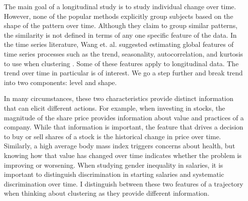 The main goal of a longitudinal study is to study individual change over time. However, none of the popular methods explicitly group subjects based on the shape of the pattern over time. Although they claim to group similar patterns, the similarity is not defined in terms of any one specific feature of the data. In the time series literature, Wang et. al. suggested estimating global features of time series processes such as the trend, seasonality, autocorrelation, and kurtosis to use when clustering \cite{wang2006}. Some of these features apply to longitudinal data. The trend over time in particular is of interest. We go a step further and break trend into two components: level and shape. 

In many circumstances, these two characteristics provide distinct information that can elicit different actions. For example, when investing in stocks, the magnitude of the share price provides information about value and practices of a company. While that information is important, the feature that drives a decision to buy or sell shares of a stock is the historical change in price over time. Similarly, a high average body mass index triggers concerns about health, but knowing how that value has changed over time indicates whether the problem is improving or worsening. When studying gender inequality in salaries, it is important to distinguish discrimination in starting salaries  and systematic discrimination over time. I distinguish between these two features of a trajectory when thinking about clustering as they provide different information.  

